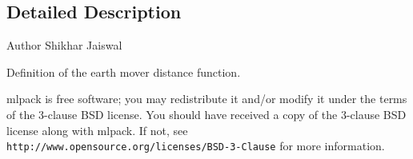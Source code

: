 \subsection{Detailed Description}
\begin{DoxyAuthor}{Author}
Shikhar Jaiswal
\end{DoxyAuthor}
Definition of the earth mover distance function.

mlpack is free software; you may redistribute it and/or modify it under the terms of the 3-\/clause B\+SD license. You should have received a copy of the 3-\/clause B\+SD license along with mlpack. If not, see {\tt http\+://www.\+opensource.\+org/licenses/\+B\+S\+D-\/3-\/\+Clause} for more information. 